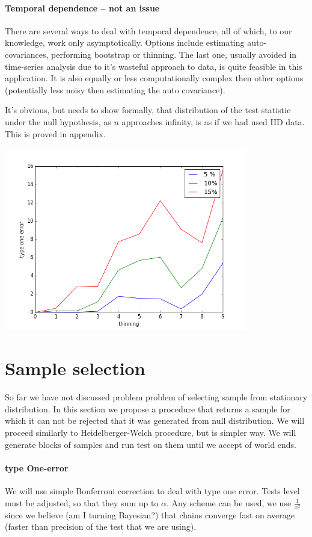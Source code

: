 \documentclass{article}
\begin{document}
\paragraph{Temporal dependence -- not an issue}
There are several ways to deal with temporal dependence, all of which, to our knowledge, work only asymptotically. Options include estimating auto-covariances, performing bootstrap or thinning. The last one, usually avoided in time-series analysis due to it's wasteful approach to data, is quite feasible in this application. It is also equally or less computationally complex then other options (potentially less noisy then estimating the auto covariance).      

It's obvious, but needs to show formally, that distribution of the test statistic under the null hypothesis, as $n$ approaches infinity, is as if we had used IID data. This is proved in appendix.

\includegraphics[width=0.8\textwidth]{type1.png}

\section{Sample selection}
So far we have not discussed problem problem of selecting sample from stationary distribution. In this section we propose a procedure that returns a sample for which it can not be rejected that it was generated from null distribution. We will proceed similarly to Heidelberger-Welch procedure, but is simpler way. We will generate blocks of samples and run test on them until we accept of world ends. 

\paragraph{type One-error}
We will use simple Bonferroni correction to deal with type one error. Tests level must be adjusted, so that they sum up to $\alpha$. Any scheme can be used, we use $\frac{1}{x^2}$ since we believe (am I turning  Bayesian?) that chains converge fast on average (faster than precision of the test that we are using).   
\end{document}
